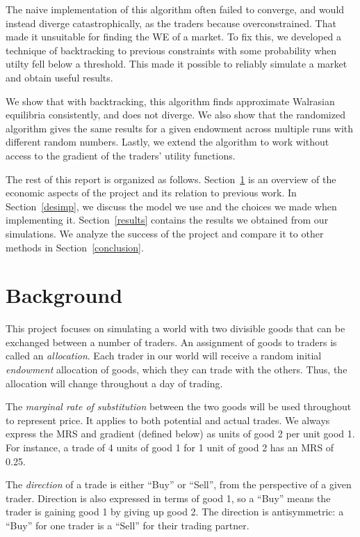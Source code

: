 \documentclass[12pt,a4paper,titlepage]{article}
\begin{document}
The naive implementation of this algorithm often failed to converge, and would instead diverge catastrophically, as the traders because overconstrained.
That made it unsuitable for finding the WE of a market.
To fix this, we developed a technique of backtracking to previous constraints with some probability when utilty fell below a threshold.
This made it possible to reliably simulate a market and obtain useful results.

We show that with backtracking, this algorithm finds approximate Walrasian equilibria consistently, and does not diverge.
We also show that the randomized algorithm gives the same results for a given endowment across multiple runs with different random numbers.
Lastly, we extend the algorithm to work without access to the gradient of the traders' utility functions.


The rest of this report is organized as follows.
Section~\ref{background} is an overview of the economic aspects of the project and its relation to previous work.
In Section~\ref{desimp}, we discuss the model we use and the choices we made when implementing it.
Section~\ref{results} contains the results we obtained from our simulations.
We analyze the success of the project and compare it to other methods in Section~\ref{conclusion}. 

\section{Background}\label{background}

This project focuses on simulating a world with two divisible goods that can be exchanged between a number of traders.
An assignment of goods to traders is called an \textit{allocation}.
Each trader in our world will receive a random initial \textit{endowment} allocation of goods, which they can trade with the others.
Thus, the allocation will change throughout a day of trading.

The \textit{marginal rate of substitution} between the two goods will be used throughout to represent price.
It applies to both potential and actual trades.
We always express the MRS and gradient (defined below) as units of good 2 per unit good 1.
For instance, a trade of 4 units of good 1 for 1 unit of good 2 has an MRS of 0.25.

The \textit{direction} of a trade is either ``Buy'' or ``Sell'', from the perspective of a given trader.
Direction is also expressed in terms of good 1, so a ``Buy'' means the trader is gaining good 1 by giving up good 2.
The direction is antisymmetric: a ``Buy'' for one trader is a ``Sell'' for their trading partner.
\end{document}
